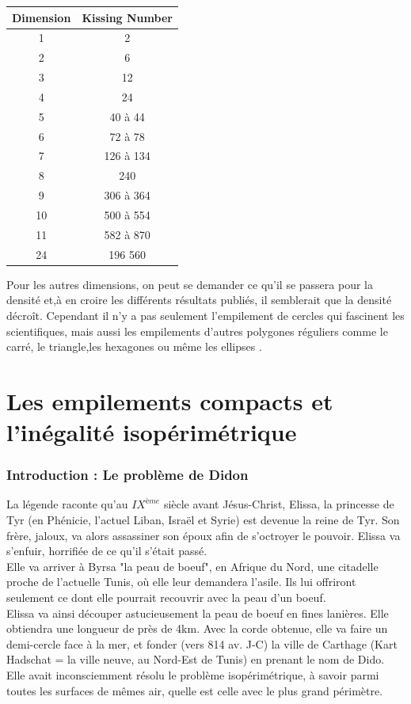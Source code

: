 \documentclass{book}
\begin{document}
\begin{tabular}{|c|c|}
\rowcolor{orange!50}
\hline Dimension & Kissing Number\\
\hline 1 & 2 \\
\hline 2 & 6 \\
\hline 3 & 12 \\
\hline 4 & 24 \\
\hline 5 & 40 à 44 \\
\hline 6 & 72 à 78 \\
\hline 7 & 126 à 134 \\
\hline 8 & 240 \\
\hline 9 & 306 à 364 \\
\hline 10 & 500 à 554 \\
\hline 11 & 582 à 870 \\
\hline 24 & 196 560 \\
\hline
\end{tabular}

{\noindent Pour les autres dimensions, on peut se demander ce qu'il se passera pour la densité et,à en croire les différents résultats publiés, il semblerait que la densité décroît.}
Cependant il n'y a pas seulement l'empilement de cercles qui fascinent les scientifiques, mais aussi les empilements d'autres polygones réguliers comme le carré, le triangle,les hexagones  ou même les ellipses .

\chapter{Les empilements compacts et l'inégalité isopérimétrique}

\subsection{Introduction : Le problème de Didon}
La légende raconte qu'au $IX^{ème}$ siècle avant Jésus-Christ, Elissa, la princesse de Tyr (en Phénicie, l'actuel Liban, Israël et Syrie) est devenue la reine de Tyr. Son frère, jaloux, va alors assassiner son époux afin de s'octroyer le pouvoir. Elissa va s'enfuir, horrifiée de ce qu'il s'était passé. \\
Elle va arriver à Byrsa "la peau de boeuf", en Afrique du Nord, une citadelle proche de l'actuelle Tunis, où elle leur demandera l'asile. Ils lui offriront seulement ce dont elle pourrait recouvrir avec la peau d'un boeuf. \\
Elissa va ainsi découper astucieusement la peau de boeuf en fines lanières. Elle obtiendra une longueur de près de 4km. Avec la corde obtenue, elle va faire un demi-cercle face à la mer, et fonder (vers 814 av. J-C) la ville de Carthage (Kart Hadschat = la ville neuve, au Nord-Est de Tunis) en prenant le nom de Dido. 
Elle avait inconsciemment résolu le problème isopérimétrique, à savoir parmi toutes les surfaces de mêmes air, quelle est celle avec le plus grand périmètre. \cite{micmath1}\\\\
\end{document}
